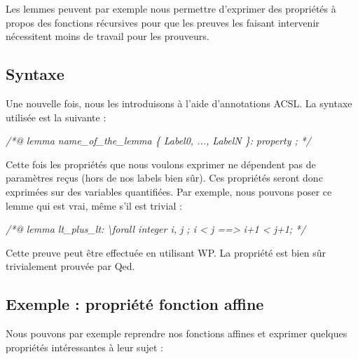\documentclass[12pt,francais,]{scrbook}
\newenvironment{Shaded}{}{}
\newcommand{\CommentTok}[1]{\textcolor[rgb]{0.38,0.63,0.69}{\textit{{#1}}}}
\begin{document}
Les lemmes peuvent par exemple nous permettre d'exprimer des propriétés
à propos des fonctions récursives pour que les preuves les faisant
intervenir nécessitent moins de travail pour les prouveurs.

\subsection{Syntaxe}\label{syntaxe-2}

Une nouvelle fois, nous les introduisons à l'aide d'annotations ACSL. La
syntaxe utilisée est la suivante :

\begin{footnotesize}\begin{Shaded}
\begin{Highlighting}[]
\CommentTok{/*@}
\CommentTok{  lemma name_of_the_lemma \{ Label0, ..., LabelN \}:}
\CommentTok{    property ;}
\CommentTok{*/}
\end{Highlighting}
\end{Shaded}\end{footnotesize}

Cette fois les propriétés que nous voulons exprimer ne dépendent pas de
paramètres reçus (hors de nos labels bien sûr). Ces propriétés seront
donc exprimées sur des variables quantifiées. Par exemple, nous pouvons
poser ce lemme qui est vrai, même s'il est trivial :

\begin{footnotesize}\begin{Shaded}
\begin{Highlighting}[]
\CommentTok{/*@}
\CommentTok{  lemma lt_plus_lt:}
\CommentTok{    \textbackslash{}forall integer i, j ; i < j ==> i+1 < j+1;}
\CommentTok{*/}
\end{Highlighting}
\end{Shaded}\end{footnotesize}

Cette preuve peut être effectuée en utilisant WP. La propriété est bien
sûr trivialement prouvée par Qed.

\subsection{Exemple : propriété fonction
affine}\label{exemple-propriuxe9tuxe9-fonction-affine}

Nous pouvons par exemple reprendre nos fonctions affines et exprimer
quelques propriétés intéressantes à leur sujet :
\end{document}
